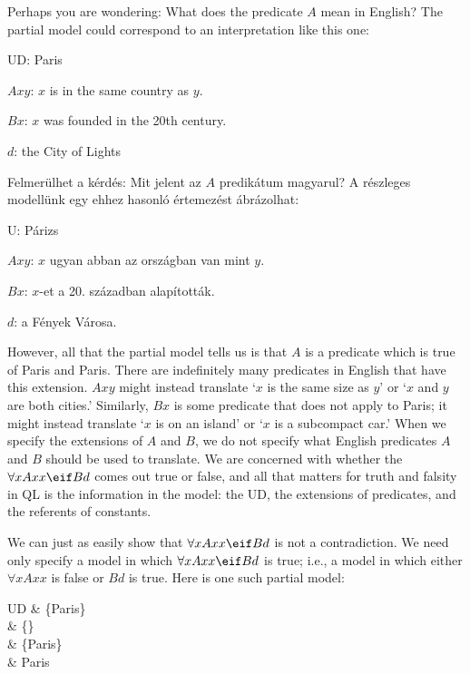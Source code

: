 Perhaps you are wondering: What does the predicate $A$ mean in English? The partial model could correspond to an interpretation like this one:
\begin{ekey}
\item[UD:] Paris
\item[$Axy$:] $x$ is in the same country as $y$.
\item[$Bx$:] $x$ was founded in the 20th century.
\item[$d$:] the City of Lights
\end{ekey}

Felmerülhet a kérdés: Mit jelent az $A$ predikátum magyarul? A részleges modellünk egy ehhez hasonló értemezést ábrázolhat:
\begin{ekey}
\item[U:] Párizs
\item[$Axy$:] $x$ ugyan abban az országban van mint $y$.
\item[$Bx$:] $x$-et a 20. században alapították.
\item[$d$:] a Fények Városa.
\end{ekey}



However, all that the partial model tells us is that $A$ is a predicate which is true of Paris and Paris. There are indefinitely many predicates in English that have this extension. $Axy$ might instead translate `$x$ is the same size as $y$' or `$x$ and $y$ are both cities.' Similarly, $Bx$ is some predicate that does not apply to Paris; it might instead translate `$x$ is on an island' or `$x$ is a subcompact car.' When we specify the extensions of $A$ and $B$, we do not specify what English predicates $A$ and $B$ should be used to translate. We are concerned with whether the $\forall xAxx \eif Bd$ comes out true or false, and all that matters for truth and falsity in QL is the information in the model: the UD, the extensions of predicates, and the referents of constants.


We can just as easily show that $\forall xAxx \eif Bd$ is not a contradiction. We need only specify a model in which $\forall xAxx \eif Bd$ is true; i.e., a model in which either $\forall x Axx$ is false or $Bd$ is true. Here is one such partial model:
\begin{partialmodel}
	UD			& \{Paris\}\\
	 	& \{\}\\
		& \{Paris\}\\
		& Paris
\end{partialmodel}


